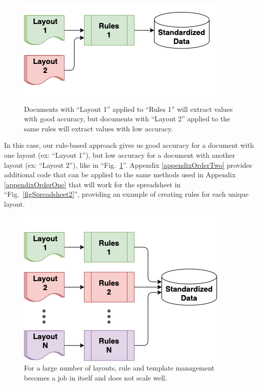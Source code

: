 \documentclass[conference]{IEEEtran}
\begin{document}
\begin{figure}[ht]
\centerline{\includegraphics[width=\columnwidth]{RulesFlow2a.png}}
\caption{Documents with ``Layout 1'' applied to ``Rules 1'' will extract values with good accuracy, but documents with ``Layout 2'' applied to the same rules will extract values with low accuracy.}
\label{figRulesFlow2a}
\end{figure}

In this case, our rule-based approach gives us good accuracy for a document with one layout (ex: ``Layout 1''), but low accuracy for a document with another layout (ex: ``Layout 2''), like in ``Fig.~\ref{figRulesFlow2a}''. Appendix \ref{appendixOrderTwo} provides additional code that can be applied to the same methods used in Appendix \ref{appendixOrderOne} that will work for the spreadsheet in ``Fig.~\ref{figSpreadsheet2}'', providing an example of creating rules for each unique layout.

\begin{figure}[ht]
\centerline{\includegraphics[width=\columnwidth]{RulesFlowN.png}}
\caption{For a large number of layouts, rule and template management becomes a job in itself and does not scale well.}
\label{figRulesFlow3}
\end{figure}
\end{document}
